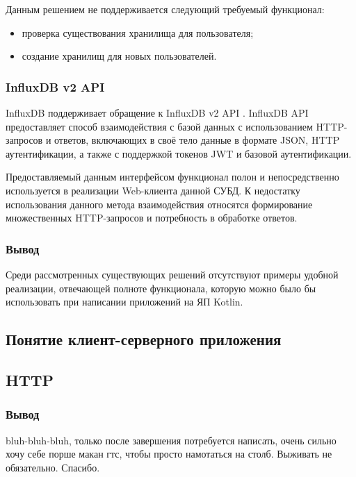 Данным решением не поддерживается следующий требуемый функционал:
\begin{itemize}[leftmargin=1.6\parindent]
\item проверка существования хранилища для пользователя;
\item создание хранилищ для новых пользователей.
\end{itemize}

\subsubsection{InfluxDB v2 API}
InfluxDB поддерживает обращение к InfluxDB v2 API \cite{influxApi}. InfluxDB API предоставляет способ взаимодействия с базой данных с использованием HTTP-запросов и ответов, включающих в своё тело данные в формате JSON, HTTP аутентификации, а также с поддержкой токенов JWT и базовой аутентификации.

Предоставляемый данным интерфейсом функционал полон и непосредственно используется в реализации Web-клиента данной СУБД. К недостатку использования данного метода взаимодействия относятся формирование множественных HTTP-запросов и потребность в обработке ответов.

\subsubsection*{Вывод}
Среди рассмотренных существующих решений отсутствуют примеры удобной реализации, отвечающей полноте функционала, которую можно было бы использовать при написании приложений на ЯП Kotlin.

\subsection{Понятие клиент-серверного приложения}

\subsection{HTTP}



\subsubsection*{Вывод}
bluh-bluh-bluh, только после завершения потребуется написать, очень сильно хочу себе порше макан гтс, чтобы просто намотаться на столб. Выживать не обязательно. Спасибо.


\pagebreak